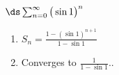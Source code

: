 {$\ds \sum_{n=0}^\infty \big(\sin 1\big)^n$
}
{\begin{enumerate}
\item		$S_n=\frac{1-(\sin 1)^{n+1}}{1-\sin 1}$
\item		Converges to $\frac{1}{1-\sin 1}$..
\end{enumerate}
}
